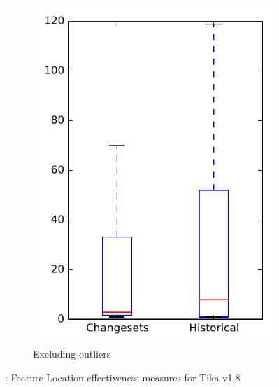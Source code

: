 \begin{figure}
\begin{subfigure}{.4\textwidth}
        \includegraphics[height=0.4\textheight]{figures/flt/rq2_tika_no_outlier}
        \caption{Excluding outliers}\label{fig:flt:rq2:tika_no_outlier}
    \end{subfigure}
\caption{\ftwo: Feature Location effectiveness measures for Tika v1.8}
\label{fig:flt:rq2:tika}
\end{figure}
